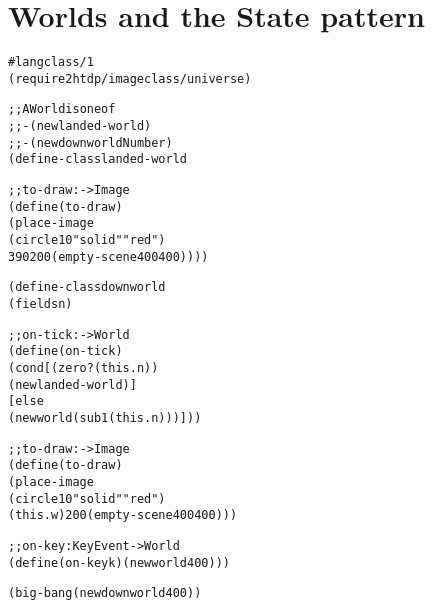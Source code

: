 \documentclass[submission,copyright]{eptcs}
\begin{document}



\appendix
\section{Worlds and the State pattern}
\label{sec:appendix}

\begin{alltt}
#lang class/1
(require 2htdp/image class/universe)

;; A World is one of 
;; - (new landed-world)
;; - (new downworld Number)
(define-class landed-world

  ;; to-draw : -> Image
  (define (to-draw) 
    (place-image 
     (circle 10 "solid" "red")
     390 200 (empty-scene 400 400))))

(define-class downworld
  (fields n)

  ;; on-tick : -> World
  (define (on-tick)
    (cond [(zero? (this . n))
           (new landed-world)]
          [else
           (new world (sub1 (this . n)))]))

  ;; to-draw : -> Image
  (define (to-draw) 
    (place-image 
     (circle 10 "solid" "red")
     (this . w) 200 (empty-scene 400 400)))

  ;; on-key : KeyEvent -> World
  (define (on-key k) (new world 400)))
  
(big-bang (new downworld 400))
\end{alltt}
\end{document}

